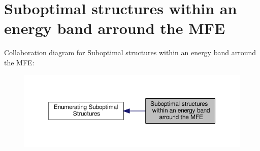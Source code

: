 \hypertarget{group__subopt__wuchty}{\section{Suboptimal structures within an energy band arround the M\-F\-E}
\label{group__subopt__wuchty}
}
Collaboration diagram for Suboptimal structures within an energy band arround the M\-F\-E\-:
\nopagebreak
\begin{figure}[H]
\begin{center}
\leavevmode
\includegraphics[width=350pt]{group__subopt__wuchty}
\end{center}
\end{figure}
